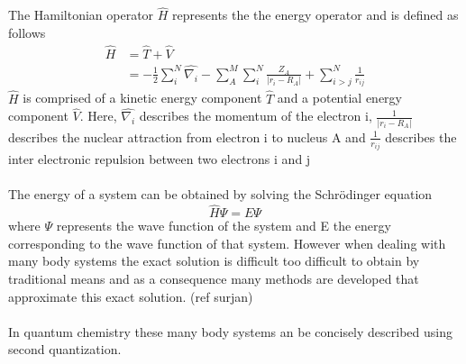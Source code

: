 \documentclass[12pt]{article}
\begin{document}
The Hamiltonian operator $\hat{H}$ represents the the energy operator  and is defined as follows
\begin{equation}
\begin{split}
\hat{H} & = \hat{T} + \hat{V} \\
& = -\frac{1}{2}\sum_{i}^{N} \hat{\nabla_i} -\sum_{A}^{M}\sum_{i}^{N} \frac{Z_A}{\lvert r_i - R_A \rvert} + \sum_{i>j}^{N} \frac{1}{r_{ij}}
\end{split} 
\end{equation}
$\hat{H}$ is comprised of a kinetic energy component $\hat{T}$ and a potential energy component $\hat{V}$. Here, $\hat{\nabla_i}$ describes the momentum of the electron i, $\frac{1}{\lvert r_i - R_A \rvert}$ describes the nuclear attraction from electron i to nucleus A and  $\frac{1}{r_{ij}}$ describes the inter electronic repulsion between two electrons i and j
\\
\\
The energy of a system can be obtained by solving the Schrödinger equation 
\begin{equation}
\hat{H}\Psi = E\Psi
\end{equation}
where $\Psi$ represents the wave function of the system and E the energy corresponding to the wave function of that system. However when dealing with many body systems the exact solution is difficult too difficult to obtain by traditional means and as a consequence many methods are developed that approximate this exact solution. (ref surjan)
\\
\\
In quantum chemistry these many body systems an be concisely described using second quantization.  
\end{document}
